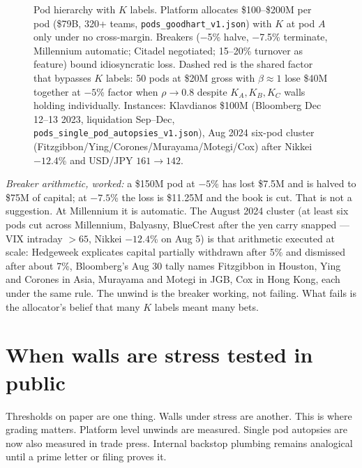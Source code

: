 \begin{figure}[h]
\caption{Pod hierarchy with $K$ labels. Platform allocates \$100--\$200M per pod (\$79B, 320+ teams, \texttt{pods\_goodhart\_v1.json}) with $K$ at pod $A$ only under no cross-margin. Breakers ($-$5\% halve, $-$7.5\% terminate, Millennium automatic; Citadel negotiated; 15--20\% turnover as feature) bound idiosyncratic loss. Dashed red is the shared factor that bypasses $K$ labels: 50 pods at \$20M gross with $\beta \approx 1$ lose \$40M together at $-5$\% factor when $\rho \to 0.8$ despite $K_A, K_B, K_C$ walls holding individually. Instances: Klavdianos \$100M (Bloomberg Dec 12--13 2023, liquidation Sep--Dec, \texttt{pods\_single\_pod\_autopsies\_v1.json}), Aug 2024 six-pod cluster (Fitzgibbon/Ying/Corones/Murayama/Motegi/Cox) after Nikkei $-12.4$\% and USD/JPY $161 \to 142$.}
\label{fig:pod-hierarchy}
\end{figure}

\noindent\textit{Breaker arithmetic, worked:} a \$150M pod at $-5$\% has lost \$7.5M and is halved to \$75M of capital; at $-7.5$\% the loss is \$11.25M and the book is cut. That is not a suggestion. At Millennium it is automatic. The August 2024 cluster (at least six pods cut across Millennium, Balyasny, BlueCrest after the yen carry snapped — VIX intraday $>65$, Nikkei $-12.4$\% on Aug 5) is that arithmetic executed at scale: Hedgeweek explicates capital partially withdrawn after 5\% and dismissed after about 7\%, Bloomberg's Aug 30 tally names Fitzgibbon in Houston, Ying and Corones in Asia, Murayama and Motegi in JGB, Cox in Hong Kong, each under the same rule. The unwind is the breaker working, not failing. What fails is the allocator's belief that many $K$ labels meant many bets.

\section{When walls are stress tested in public}

Thresholds on paper are one thing. Walls under stress are another. This is where grading matters. Platform level unwinds are measured. Single pod autopsies are now also measured in trade press. Internal backstop plumbing remains analogical until a prime letter or filing proves it.

